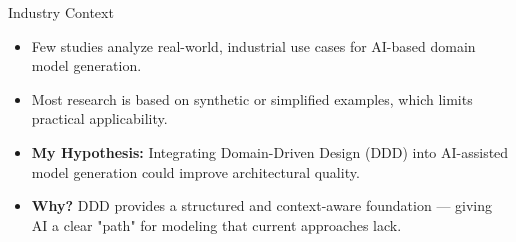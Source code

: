 \documentclass[aspectratio=169,12pt]{beamer}
\begin{document}
\begin{frame}{Industry Context}

    \begin{itemize}
        \item Few studies analyze real-world, industrial use cases for AI-based domain model generation.
        
        \item Most research is based on synthetic or simplified examples, which limits practical applicability.
        
        \item \textbf{My Hypothesis:} Integrating Domain-Driven Design (DDD) into AI-assisted model generation could improve architectural quality.
        
        \item \textbf{Why?} DDD provides a structured and context-aware foundation — giving AI a clear "path" for modeling that current approaches lack.
    \end{itemize}
    
\end{frame}
\end{document}
